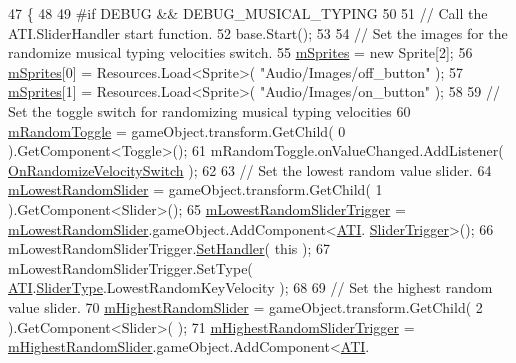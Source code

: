 \begin{DoxyCode}
47     \{
48 
49 \textcolor{preprocessor}{#if DEBUG && DEBUG\_MUSICAL\_TYPING}
50 
51         \textcolor{comment}{// Call the ATI.SliderHandler start function.}
52         base.Start();
53 
54         \textcolor{comment}{// Set the images for the randomize musical typing velocities switch.}
55         \hyperlink{class_a_t_i___velocity_handler_a7e2452c41bbcdd313afb2e53fac4a975}{mSprites} = \textcolor{keyword}{new} Sprite[2];
56         \hyperlink{class_a_t_i___velocity_handler_a7e2452c41bbcdd313afb2e53fac4a975}{mSprites}[0] = Resources.Load<Sprite>( \textcolor{stringliteral}{"Audio/Images/off\_button"} );
57         \hyperlink{class_a_t_i___velocity_handler_a7e2452c41bbcdd313afb2e53fac4a975}{mSprites}[1] = Resources.Load<Sprite>( \textcolor{stringliteral}{"Audio/Images/on\_button"} );
58 
59         \textcolor{comment}{// Set the toggle switch for randomizing musical typing velocities}
60         \hyperlink{class_a_t_i___velocity_handler_a6ca709a10f8b2eb0f1141c589e7f9742}{mRandomToggle} = gameObject.transform.GetChild( 0 ).GetComponent<Toggle>();
61         mRandomToggle.onValueChanged.AddListener( \hyperlink{class_a_t_i___velocity_handler_a1091248299687641294f363aa32de0f0}{OnRandomizeVelocitySwitch} );
62 
63         \textcolor{comment}{// Set the lowest random value slider.}
64         \hyperlink{class_a_t_i___velocity_handler_aba4ceb157ad404a47cedb3583e81d194}{mLowestRandomSlider} = gameObject.transform.GetChild( 1 ).GetComponent<Slider>();
65         \hyperlink{class_a_t_i___velocity_handler_a13d55e2f5670e3f1eb78645a75aa1bce}{mLowestRandomSliderTrigger} = 
      \hyperlink{class_a_t_i___velocity_handler_aba4ceb157ad404a47cedb3583e81d194}{mLowestRandomSlider}.gameObject.AddComponent<\hyperlink{class_a_t_i}{ATI}.
      \hyperlink{class_a_t_i_1_1_slider_trigger}{SliderTrigger}>();
66         mLowestRandomSliderTrigger.\hyperlink{class_a_t_i_1_1_slider_trigger_a258f79d013266d0c82a5382525adcdef}{SetHandler}( \textcolor{keyword}{this} );
67         mLowestRandomSliderTrigger.SetType( \hyperlink{class_a_t_i}{ATI}.\hyperlink{class_a_t_i_ac4c6056a99cbd16ff0d292d33b038b9b}{SliderType}.LowestRandomKeyVelocity );
68 
69         \textcolor{comment}{// Set the highest random value slider.}
70         \hyperlink{class_a_t_i___velocity_handler_aec243511d869243292e215a24e87f192}{mHighestRandomSlider} = gameObject.transform.GetChild( 2 ).GetComponent<Slider>(
      );
71         \hyperlink{class_a_t_i___velocity_handler_aae4118883cf2e5489ef483f220e48e45}{mHighestRandomSliderTrigger} = 
      \hyperlink{class_a_t_i___velocity_handler_aec243511d869243292e215a24e87f192}{mHighestRandomSlider}.gameObject.AddComponent<\hyperlink{class_a_t_i}{ATI}.

\end{DoxyCode}
